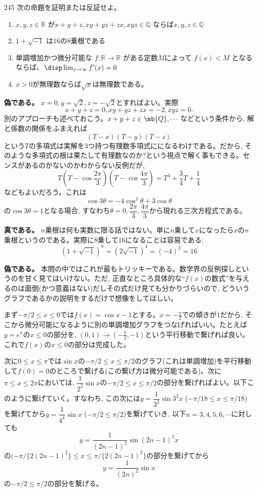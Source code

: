 \begin{prob}{245}{}{}
 次の命題を証明または反証せよ。
 \begin{enumerate}
  \item $x,y,z\in\mathbb{R}$ が$x+y+z,xy+yz+zx,xyz\in\mathbb{Q}$ ならば$x,y,z\in\mathbb{Q}$
  \item $1+\sqrt{-1}$ は16の8乗根である
  \item 単調増加かつ微分可能な $f:\mathbb{R}\rightarrow\mathbb{R}$ がある定数$M$によって $f(x)<M$ となるならば、$\disp \lim_{x\to\infty} f'(x)=0$
  \item $x>0$が無理数ならば$\sqrt{x}$は無理数である。
 \end{enumerate}
\end{prob}

\textbf{偽である。} $x=0, y=\sqrt{2}, z=-\sqrt{2}$とすればよい。実際
\[x+y+z = 0,  xy+yz+zx = -2, xyz = 0.\]
別のアプローチも述べておこう。$x+y+z\in \mb{Q},\cdots$などという条件から, 解と係数の関係をふまえれば
\[(T-x)(T-y)(T-z)\]
という$T$の多項式は実解を3つ持つ有理数多項式にになるわけである。だから, そのような多項式の根は果たして有理数なのか?という視点で解く事もできる。センスがあるのかないのかわからない反例だが,  
\[T(T-\cos{\dfrac{2\pi}{3}})(T-\cos{\dfrac{4\pi}{3}}) = T^3 + \dfrac{3}{4}T +\dfrac{1}{4}\]
などもよいだろう。これは
\[\cos{3\theta} = -4\cos^{3}{\theta} + 3\cos{\theta}\]
の$\cos{3\theta} = 1$となる場合, すなわち$\theta =0, \dfrac{2\pi}{3}, \dfrac{4\pi}{3}$から現れる三次方程式である。 

\textbf{真である。} $n$乗根は何も実数に限る話ではない。単に$n$乗して$x$になったら$x$の$n$乗根というのである。実際に8乗して$16$になることは容易である:
\[(1+\sqrt{-1})^8 = (2\sqrt{-1})^{4} = (-4)^2  = 16\]

\textbf{偽である。} 本問の中ではこれが最もトリッキーである。数学界の反例探しというのを甘く見てはいけない。ただ, 正直なところ具体的な``$f(x)$の数式''を与えるのは面倒(かつ意義はない)だしその式だけ見ても分かりづらいので, どういうグラフであるかの説明をするだけで想像をしてほしい。

まず$-\pi/2 \leq x\leq 0$では$f(x) = \cos{x} - 1$とする。$x=-\frac{\pi}{2}$での傾きが$1$だから, そこから微分可能になるように別の単調増加グラフをつなげればいい。たとえば$y=e^{x}$の$x\leq 0$の部分を, $(0,1)\to (-\frac{\pi}{2}, -1)$という平行移動で繋げれば良い。これで$f(x)$の$x\leq 0$の部分は完成した。

次に$0\leq x\leq \pi$では$\sin{x}$の$-\pi/2\leq x\leq \pi/2$のグラフ(これは単調増加)を平行移動して$f(0)=0$のところで繋げる(この繋げ方は微分可能である)。次に$\pi \leq x\leq 2\pi$においては, $\dfrac{1}{2^{2}}\sin{x}$の$-\pi/2\leq x\leq \pi/2$の部分を繋げればよい。以下このように繋げていく。すなわち, この次には$y=\dfrac{1}{3^{2}}\sin{3^2x}$ ($-\pi/18\leq x\leq\pi/18$)を繋げてから$y=\dfrac{1}{4^{4}}\sin{x}$ ($-\pi/2\leq \pi/2$)を繋げていき, 以下$n=3,4,5,6,\cdots$に対しても
\[y=\dfrac{1}{(2n-1)^2}\sin{(2n-1)^2x}\]
の$(-\pi/\{2(2n-1)^2\}\leq x\leq \pi/\{2(2n-1)^2\}$の部分を繋げてから
\[y=\dfrac{1}{(2n)^2}\sin{x}\]
の$-\pi/2\leq\pi/2$の部分を繋げる。

